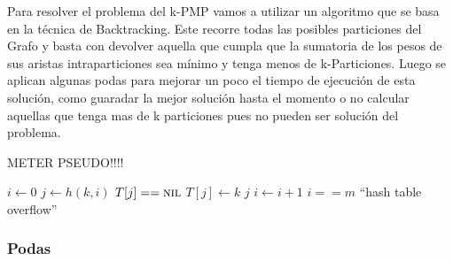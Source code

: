 Para resolver el problema del k-PMP vamos a utilizar un algoritmo que se basa en la t\'ecnica de Backtracking. Este recorre todas las posibles particiones del Grafo y basta con devolver aquella que cumpla que la sumatoria de los pesos de sus aristas intraparticiones sea m\'inimo y tenga menos de k-Particiones.
Luego se aplican algunas podas para mejorar un poco el tiempo de ejecuci\'on de esta soluci\'on, como guaradar la mejor soluci\'on hasta el momento o no calcular aquellas que tenga mas de k particiones pues no pueden ser soluci\'on del problema.

METER PSEUDO!!!!

\begin{codebox}
  \li $i \gets 0$
  \li \Repeat
  \li   $j \gets h(k,i)$
  \li   \If $T[j] == \textnormal{\scshape nil}$
  \li   \Then
          $T[j] \gets k$
  \li     \Return $j$
  \li   \Else
          $i \gets i+1$
        \End
        \For
        \While
  \li \Until $i == m$
  \li \Error ``hash table overflow''
\end{codebox}

\subsubsection{Podas}


